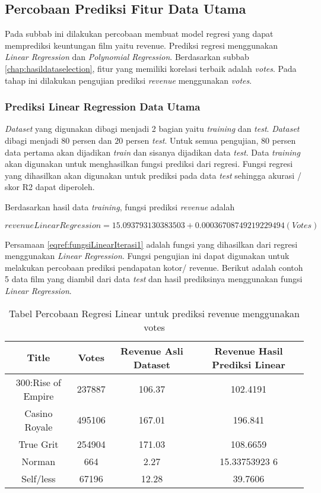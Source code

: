 \subsection{Percobaan Prediksi Fitur Data Utama}
Pada subbab ini dilakukan percobaan membuat model regresi yang dapat memprediksi keuntungan film yaitu revenue. Prediksi regresi menggunakan \textit{Linear Regression} dan \textit{Polynomial Regression}. Berdasarkan subbab \ref{chap:hasildataselection}, fitur yang memiliki korelasi terbaik adalah \textit{votes}. Pada tahap ini dilakukan pengujian prediksi \textit{revenue} menggunakan \textit{votes}.

\subsubsection{Prediksi Linear Regression Data Utama}
\textit{Dataset} yang digunakan dibagi menjadi 2 bagian yaitu \textit{training} dan \textit{test}. \textit{Dataset} dibagi menjadi $80$ persen dan $20$ persen \textit{test}. Untuk semua pengujian, 80 persen data pertama akan dijadikan \textit{train} dan sisanya dijadikan data \textit{test}. Data \textit{training} akan digunakan untuk menghasilkan fungsi prediksi dari regresi. Fungsi regresi yang dihasilkan akan digunakan untuk prediksi pada data \textit{test} sehingga akurasi / skor R2 dapat diperoleh. 

Berdasarkan hasil data \textit{training}, fungsi prediksi \textit{revenue} adalah 

\begin{equation}
revenueLinearRegression = 15.093793130383503 + 0.00036708749219229494(Votes)
\label{eqref:fungsiLinearIterasi1}
\end{equation}

Persamaan \ref{eqref:fungsiLinearIterasi1} adalah fungsi yang dihasilkan dari regresi menggunakan \textit{Linear Regression}. Fungsi pengujian ini dapat digunakan untuk melakukan percobaan prediksi pendapatan kotor/ revenue. Berikut adalah contoh 5 data film yang diambil dari data \textit{test} dan hasil prediksinya menggunakan fungsi \textit{Linear Regression}.


\begin{table}[H]
\caption{Tabel Percobaan Regresi Linear untuk prediksi revenue menggunakan votes}
\centering
\begin{tabular}{|c|c|c|c|}
\hline 
Title &Votes & Revenue Asli Dataset & Revenue Hasil Prediksi Linear \\ 
\hline 
300:Rise of Empire & 237887 & 106.37 & 102.4191 \\ 
\hline 
Casino Royale & 495106 & 167.01 & 196.841 \\ 
\hline 
True Grit & 254904 & 171.03 & 108.6659 \\ 
\hline 
Norman & 664 & 2.27 & 15.33753923
6 \\ 
\hline 
Self/less& 67196 & 12.28 & 39.7606 \\ 
\hline 
\end{tabular} 
\label{tab:tabel5regresilineariterasi1}
\end{table}


